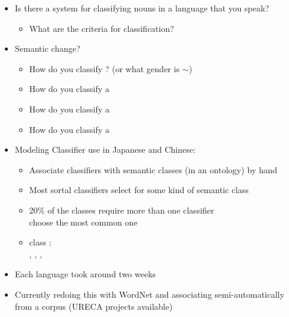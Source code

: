 \documentclass[headrule,footrule]{foils}
\begin{document}
\MyLogo{}
\begin{itemize}
\item    Is there a system for classifying nouns in a 
language that you speak? \task
\begin{itemize}
\item  What are the criteria for classification? \task
\end{itemize}
\item  Semantic change?  
\begin{itemize}
\item  How do you classify ?   (or what gender is $\sim$)\task
\item  How do you classify a  \task
\item  How do you classify a  \task
\item  How do you classify a  \task
\end{itemize}
\end{itemize}



\begin{itemize}
\item Modeling Classifier use in  Japanese and Chinese:
  \begin{itemize}
  \item Associate classifiers with semantic classes (in an ontology) by hand
  \item Most sortal classifiers select for some kind of semantic class
  \item 20\% of the classes require more than one classifier\\
    choose the most common one
  \item class :\\
    , ,
    , 
  \end{itemize}
\item Each language took around two weeks
\item Currently redoing this with WordNet and associating
  semi-automatically from a corpus (URECA projects available)
\end{itemize}
\end{document}
